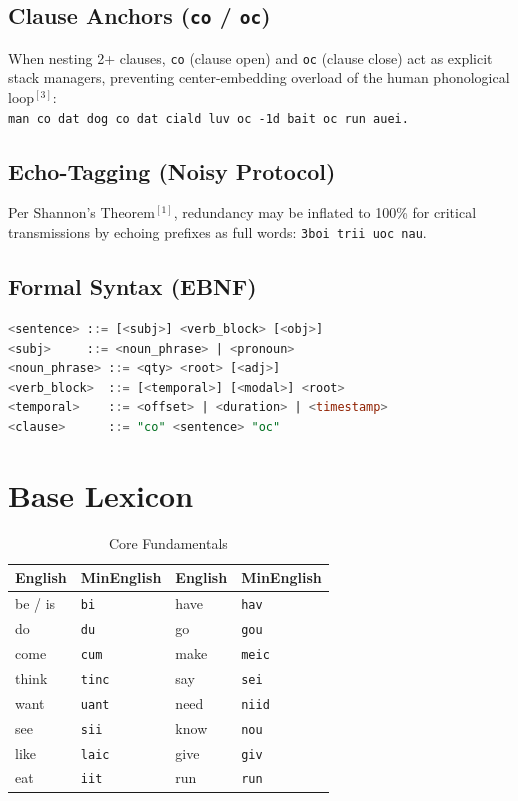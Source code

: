 \documentclass[10pt,onecolumn,letterpaper]{article}
\newcommand{\me}[1]{\texttt{#1}}
\begin{document}
\subsection{Clause Anchors (\me{co} / \me{oc})}
When nesting 2+ clauses, \me{co} (clause open) and \me{oc} (clause close)
act as explicit stack managers, preventing center-embedding overload of
the human phonological loop$^{[3]}$:\\
\me{man co dat dog co dat ciald luv oc -1d bait oc run auei.}

\subsection{Echo-Tagging (Noisy Protocol)}
Per Shannon's Theorem$^{[1]}$, redundancy may be inflated to 100\% for
critical transmissions by echoing prefixes as full words: \me{3boi trii uoc nau}.

\subsection{Formal Syntax (EBNF)}

\begin{lstlisting}[language=SQL]
<sentence> ::= [<subj>] <verb_block> [<obj>]
<subj>     ::= <noun_phrase> | <pronoun>
<noun_phrase> ::= <qty> <root> [<adj>]
<verb_block>  ::= [<temporal>] [<modal>] <root>
<temporal>    ::= <offset> | <duration> | <timestamp>
<clause>      ::= "co" <sentence> "oc"
\end{lstlisting}

\section{Base Lexicon}

\begin{table}[h!]
\centering\small
\begin{tabularx}{\linewidth}{lXlX}
\toprule
\textbf{English} & \textbf{MinEnglish} & \textbf{English} & \textbf{MinEnglish} \\
\midrule
be / is     & \me{bi}   & have       & \me{hav}   \\
do          & \me{du}   & go         & \me{gou}   \\
come        & \me{cum}  & make       & \me{meic}  \\
think       & \me{tinc} & say        & \me{sei}   \\
want        & \me{uant} & need       & \me{niid}  \\
see         & \me{sii}  & know       & \me{nou}   \\
like        & \me{laic} & give       & \me{giv}   \\
eat         & \me{iit}  & run        & \me{run}   \\
\bottomrule
\end{tabularx}
\caption{Core Fundamentals}
\end{table}
\end{document}
